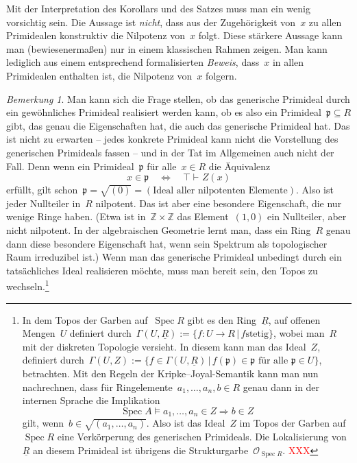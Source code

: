 \documentclass[a4paper,ngerman,12pt]{scrartcl}
\theoremstyle{definition}
\theoremstyle{plain}
\theoremstyle{remark}
\newtheorem{bem}[defn]{Bemerkung}
\newcommand{\ZZ}{\mathbb{Z}}
\newcommand{\pp}{\mathfrak{p}}
\renewcommand{\O}{\mathcal{O}}
\newcommand{\ul}[1]{\underline{#1}}
\DeclareMathOperator{\Spec}{Spec}
\newcommand{\seq}[1]{\mathrel{\vdash\!\!\!_{#1}}}
\renewcommand{\_}{\mathpunct{.}\,}
\newcommand{\?}{\,{:}\,}
\newcommand{\XXX}[1]{\textcolor{red}{#1}}
\begin{document}
Mit der Interpretation des Korollars und des Satzes muss man ein wenig
vorsichtig sein. Die Aussage ist \emph{nicht}, dass aus der Zugehörigkeit
von~$x$ zu allen Primidealen konstruktiv die Nilpotenz von~$x$ folgt. Diese stärkere
Aussage kann man (bewiesenermaßen) nur in einem klassischen Rahmen zeigen.
Man kann lediglich aus einem entsprechend formalisierten
\emph{Beweis}, dass~$x$ in allen Primidealen enthalten ist, die Nilpotenz
von~$x$ folgern.

\begin{bem}
Man kann sich die Frage stellen, ob das generische Primideal durch ein
gewöhnliches Primideal realisiert werden kann, ob es also ein Primideal~$\pp
\subseteq R$ gibt, das genau die Eigenschaften hat, die auch das generische
Primideal hat. Das ist nicht zu erwarten -- jedes konkrete Primideal kann nicht
die Vorstellung des generischen Primideals fassen -- und in der Tat im
Allgemeinen auch nicht der Fall. Denn wenn ein Primideal~$\pp$ für alle~$x \in
R$ die Äquivalenz
\[ x \in \pp \quad\Longleftrightarrow\quad \top \seq{} Z(x) \]
erfüllt, gilt schon~$\pp = \sqrt{(0)} = (\text{Ideal aller nilpotenten
Elemente})$. Also ist jeder Nullteiler in~$R$ nilpotent. Das ist aber eine
besondere Eigenschaft, die nur wenige Ringe haben. (Etwa ist in~$\ZZ \times
\ZZ$ das Element~$(1,0)$ ein Nullteiler, aber nicht nilpotent. In der
algebraischen Geometrie lernt man, dass ein Ring~$R$ genau dann diese besondere
Eigenschaft hat, wenn sein Spektrum als topologischer Raum irreduzibel ist.)
Wenn man das generische Primideal unbedingt durch ein tatsächliches Ideal
realisieren möchte, muss man bereit sein, den Topos zu wechseln.\footnote{In dem
Topos der Garben auf~$\Spec R$ gibt es den Ring~$\ul{R}$, auf offenen
Mengen~$U$ definiert durch~$\Gamma(U,\ul{R}) := \{ f : U \to R \,|\, \text{$f$
stetig} \}$, wobei man~$R$ mit der diskreten Topologie versieht. In diesem kann
man das Ideal~$Z$, definiert durch~$\Gamma(U,Z) := \{ f \in
\Gamma(U,\ul{R}) \,|\, \text{$f(\pp) \in \pp$ für alle~$\pp \in U$} \}$,
betrachten. Mit den Regeln der Kripke--Joyal-Semantik kann man nun nachrechnen,
dass für Ring\-elemen\-te~$a_1,\ldots,a_n, b \in R$ genau dann in der internen
Sprache die Implikation
\[ \Spec A \models a_1,\ldots,a_n \in Z \Rightarrow b \in Z \]
gilt, wenn~$b \in \sqrt{(a_1,\ldots,a_n)}$. Also ist das Ideal~$Z$ im Topos der
Garben auf~$\Spec R$ eine Verkörperung des generischen Primideals. Die
Lokalisierung von~$\ul{R}$ an diesem Primideal ist übrigens die
Strukturgarbe~$\O_{\Spec R}$. \XXX{XXX}}
\end{bem}
\end{document}
